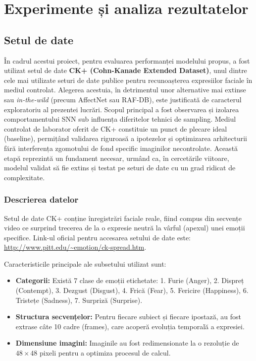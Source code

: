 \chapter{Experimente și analiza rezultatelor}

\section{Setul de date}

În cadrul acestui proiect, pentru evaluarea performanței modelului propus, a fost utilizat setul de date \textbf{CK+ (Cohn-Kanade Extended Dataset)}, unul dintre cele mai utilizate seturi de date publice pentru recunoașterea expresiilor faciale în mediul controlat. Alegerea acestuia, în detrimentul unor alternative mai extinse sau \textit{in-the-wild} (precum AffectNet sau RAF-DB), este justificată de caracterul exploratoriu al prezentei lucrări. Scopul principal a fost observarea și izolarea comportamentului SNN sub influența diferitelor tehnici de sampling. Mediul controlat de laborator oferit de CK+ constituie un punct de plecare ideal (baseline), permițând validarea riguroasă a ipotezelor și optimizarea arhitecturii fără interferența zgomotului de fond specific imaginilor necontrolate. Această etapă reprezintă un fundament necesar, urmând ca, în cercetările viitoare, modelul validat să fie extins și testat pe seturi de date cu un grad ridicat de complexitate.

\subsection*{Descrierea datelor}
Setul de date CK+ conține înregistrări faciale reale, fiind compus din secvențe video ce surprind trecerea de la o expresie neutră la vârful (apexul) unei emoții specifice. 
Link-ul oficial pentru accesarea setului de date este: \url{http://www.pitt.edu/~emotion/ck-spread.htm}.

Caracteristicile principale ale subsetului utilizat sunt:
\begin{itemize}
	\item \textbf{Categorii:} Există 7 clase de emoții etichetate: 1. Furie (Anger), 2. Dispreț (Contempt), 3. Dezgust (Disgust), 4. Frică (Fear), 5. Fericire (Happiness), 6. Tristețe (Sadness), 7. Surpriză (Surprise).
	\item \textbf{Structura secvențelor:} Pentru fiecare subiect și fiecare ipostază, au fost extrase câte 10 cadre (frames), care acoperă evoluția temporală a expresiei.
	\item \textbf{Dimensiune imagini:} Imaginile au fost redimensionate la o rezoluție de $48 \times 48$ pixeli pentru a optimiza procesul de calcul.
\end{itemize}

